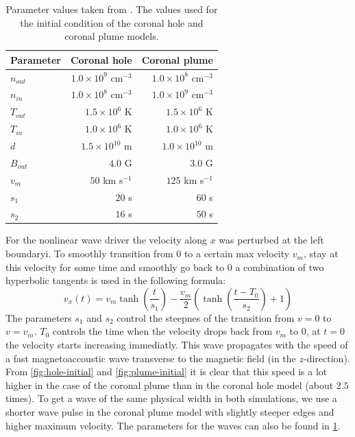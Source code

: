 \begin{table}[H]
	\centering
	\begin{tabular}{|l|r|r|}
		\toprule
		Parameter & Coronal hole & Coronal plume\\
		\midrule
		$n_{out}$ & $1.0\times 10^9$ cm$^{-3}$ & $1.0\times 10^8$ cm$^{-3}$\\
		$n_{in}$ & $1.0\times 10^8$ cm$^{-3}$ & $1.0\times 10^9$ cm$^{-3}$\\
		$T_{out}$ & $1.5\times 10^6$ K & $1.5\times 10^6$ K\\
		$T_{in}$ & $1.0\times10^6$ K & $1.0\times10^6$ K\\
		$d$ & $1.5\times10^{10}$ m& $1.0\times10^{10}$ m \\
		$B_{out} $ & $4.0$ G & $3.0$ G\\
		\midrule
		$v_m$ & $50$ km s$^{-1}$ & $125$ km s$^{-1}$ \\
		$s_1$ & $20$ s & $60$ s \\
		$s_2$ & $16$ s& $50$ s\\
		\bottomrule
	\end{tabular}
	\caption{Parameter values taken from \cite{coronal-hole}. The values used for the initial condition of the coronal hole and coronal plume models.}
	\label{tab:parameters-hole}
\end{table}
For the nonlinear wave driver the velocity along $x$ was perturbed at the left boundaryi. 
To smoothly transition from $0$ to a certain max velocity $v_m$, stay at this velocity for some time and smoothly go back to $0$ a combination of two hyperbolic tangents is used in the following formula:
\begin{equation}
	v_x(t) = v_m \tanh \left( \frac{t}{s_1} \right) - \frac{v_m}{2} \left( \tanh \left( \frac{t-T_0}{s_2} \right) +1 \right) 
\end{equation}
The parameters $s_1$ and $s_2$ control the steepnes of the transition from $v=0$ to $v=v_m$.
$T_0$ controls the time when the velocity drops back from $v_m$ to $0$, at $t=0$ the velocity starts increasing immediatly.
This wave propagates with the speed of a fast magnetoaccoustic wave transverse to the magnetic field (in the $z$-direction).
From \cref{fig:hole-initial} and \cref{fig:plume-initial} it is clear that this speed is a lot higher in the case of the coronal plume than in the coronal hole model (about $2.5$ times).
To get a wave of the same physical width in both simulations, we use a shorter wave pulse in the coronal plume model with slightly steeper edges and higher maximum velocity.
The parameters for the waves can also be found in \cref{tab:parameters-hole}.

